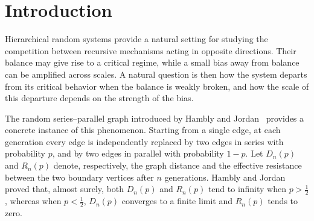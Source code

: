 \documentclass[12pt]{amsart}
\numberwithin{equation}{section}
\theoremstyle{plain}
\theoremstyle{definition}
\begin{document}
\maketitle
{}
\section{Introduction}
\label{sec:introduction}

Hierarchical random systems provide a natural setting for studying the
competition between recursive mechanisms acting in opposite directions.
Their balance may give rise to a critical regime, while a small bias away
from balance can be amplified across scales.  A natural question is then how
the system departs from its critical behavior when the balance is weakly
broken, and how the scale of this departure depends on the strength of the
bias.

The random series--parallel graph introduced by Hambly and
Jordan~\cite{HamblyJordan2004} provides a concrete instance of this
phenomenon.  Starting from a single edge, at each generation every edge is
independently replaced by two edges in series with probability $p$, and by
two edges in parallel with probability $1-p$.  Let $D_n(p)$ and $R_n(p)$
denote, respectively, the graph distance and the effective resistance
between the two boundary vertices after $n$ generations.  Hambly and
Jordan~\cite[Theorem~2.1 and Lemma~3.1]{HamblyJordan2004}
proved that, almost surely, both $D_n(p)$ and $R_n(p)$ tend to infinity when
$p>\frac12$, whereas when $p<\frac12$, $D_n(p)$ converges to a finite limit
and $R_n(p)$ tends to zero.
\end{document}
